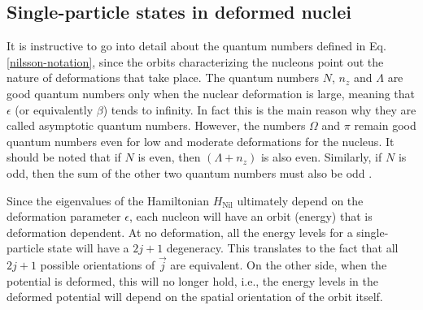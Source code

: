 \subsection{Single-particle states in deformed nuclei}

It is instructive to go into detail about the quantum numbers defined in Eq. \ref{nilsson-notation}, since the orbits characterizing the nucleons point out the nature of deformations that take place. The quantum numbers $N$, $n_z$ and $\Lambda$ are good quantum numbers only when the nuclear deformation is large, meaning that $\epsilon$ (or equivalently $\beta$) tends to infinity. In fact this is the main reason why they are called asymptotic quantum numbers. However, the numbers $\Omega$ and $\pi$ remain good quantum numbers even for low and moderate deformations for the nucleus. It should be noted that if $N$ is even, then $(\Lambda+n_z)$ is also even. Similarly, if $N$ is odd, then the sum of the other two quantum numbers must also be odd \cite{casten2000nuclear}.

Since the eigenvalues of the Hamiltonian $H_\text{Nil}$ ultimately depend on the deformation parameter $\epsilon$, each nucleon will have an orbit (energy) that is deformation dependent. At no deformation, all the energy levels for a single-particle state will have a $2j+1$ degeneracy. This translates to the fact that all $2j+1$ possible orientations of $\vec{j}$ are equivalent. On the other side, when the potential is deformed, this will no longer hold, i.e., the energy levels in the deformed potential will depend on the spatial orientation of the orbit itself.

